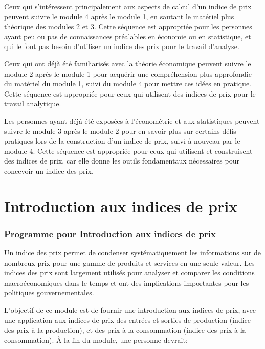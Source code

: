 \documentclass[
]{article}
\begin{document}
Ceux qui s'intéressent principalement aux aspects de calcul d'un indice de prix peuvent suivre le module 4 après le module 1, en sautant le matériel plus théorique des modules 2 et 3. Cette séquence est appropriée pour les personnes ayant peu ou pas de connaissances préalables en économie ou en statistique, et qui le font pas besoin d'utiliser un indice des prix pour le travail d'analyse.

Ceux qui ont déjà été familiarisés avec la théorie économique peuvent suivre le module 2 après le module 1 pour acquérir une compréhension plus approfondie du matériel du module 1, suivi du module 4 pour mettre ces idées en pratique. Cette séquence est appropriée pour ceux qui utilisent des indices de prix pour le travail analytique.

Les personnes ayant déjà été exposées à l'économétrie et aux statistiques peuvent suivre le module 3 après le module 2 pour en savoir plus sur certains défis pratiques lors de la construction d'un indice de prix, suivi à nouveau par le module 4. Cette séquence est appropriée pour ceux qui utilisent et construisent des indices de prix, car elle donne les outils fondamentaux nécessaires pour concevoir un indice des prix.

\hypertarget{part-introduction-aux-indices-de-prix}{%
\part{Introduction aux indices de prix}\label{part-introduction-aux-indices-de-prix}}

\hypertarget{programme-pour-introduction-aux-indices-de-prix}{%
\section{Programme pour Introduction aux indices de prix}\label{programme-pour-introduction-aux-indices-de-prix}}

Un indice des prix permet de condenser systématiquement les informations sur de nombreux prix pour une gamme de produits et services en une seule valeur. Les indices des prix sont largement utilisés pour analyser et comparer les conditions macroéconomiques dans le temps et ont des implications importantes pour les politiques gouvernementales.

L'objectif de ce module est de fournir une introduction aux indices de prix, avec une application aux indices de prix des entrées et sorties de production (indice des prix à la production), et des prix à la consommation (indice des prix à la consommation). À la fin du module, une personne devrait:
\end{document}
